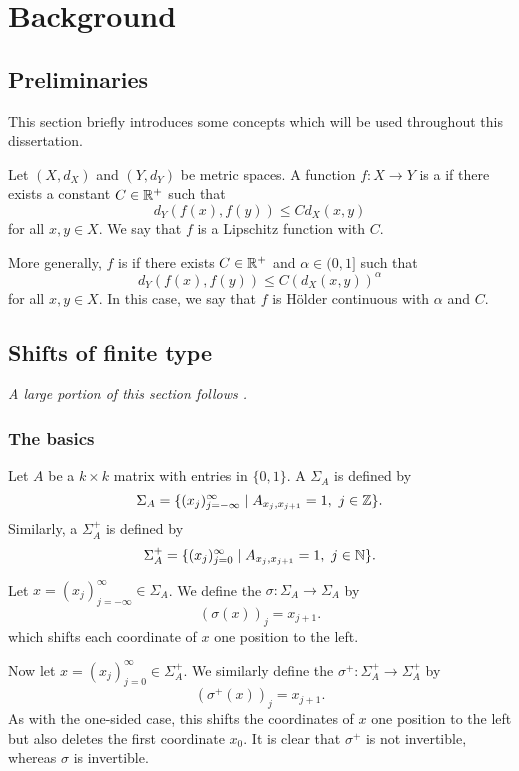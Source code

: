 \chapter{Background}
\section{Preliminaries}
This section briefly introduces some concepts which will be used throughout this dissertation.

\begin{definition}
	Let $(X, d_X)$ and $(Y, d_Y)$ be metric spaces. A function $f : X \to Y$ is a  if there exists a constant $C \in \mathbb{R}^+$ such that
	\[
	d_Y(f(x), f(y)) \leq Cd_X(x, y)
	\]
	for all $x, y \in X$. We say that $f$ is a Lipschitz function with  $C$.~\cite[p154]{searcoid:metric-spaces}
	
	More generally, $f$ is  if there exists $C \in \mathbb{R}^+$ and $\alpha \in (0, 1]$ such that
	\[
	d_Y(f(x), f(y)) \leq C(d_X(x, y))^\alpha
	\]
	for all $x, y \in X$. In this case, we say that $f$ is H\"older continuous with  $\alpha$ and  $C$.~\cite[p143]{brin-stuck:dynsys}
\end{definition}

\section{Shifts of finite type}
\emph{A large portion of this section follows \cite[Chapter 1]{parry-pollicott:zeta-fns-periodic-orbits}.}
\subsection{The basics}
Let $A$ be a $k \times k$ matrix with entries in $\{0, 1\}$. A  $\Sigma_A$ is defined by
\[
	\Sigma_A = \{(x_j)_{j = -\infty}^\infty \mid A_{x_j, x_{j + 1}} = 1,\ j \in \mathbb{Z}\}.
\]
Similarly, a  $\Sigma_A^+$ is defined by
\[
	\Sigma_A^+ = \{(x_j)_{j = 0}^\infty \mid A_{x_j, x_{j + 1}} = 1,\ j \in \mathbb{N}\}.
\]

Let $x = (x_j)_{j = -\infty}^\infty \in \Sigma_A$. We define the  $\sigma : \Sigma_A \to \Sigma_A$ by
\[
	(\sigma(x))_j = x_{j + 1}.
\]
which shifts each coordinate of $x$ one position to the left.

Now let $x = (x_j)_{j = 0}^\infty \in \Sigma_A^+$. We similarly define the  $\sigma^+ : \Sigma_A^+ \to \Sigma_A^+$ by
\[
	(\sigma^+(x))_j = x_{j + 1}.
\]
As with the one-sided case, this shifts the coordinates of $x$ one position to the left but also deletes the first coordinate $x_0$. It is clear that $\sigma^+$ is not invertible, whereas $\sigma$ is invertible.

